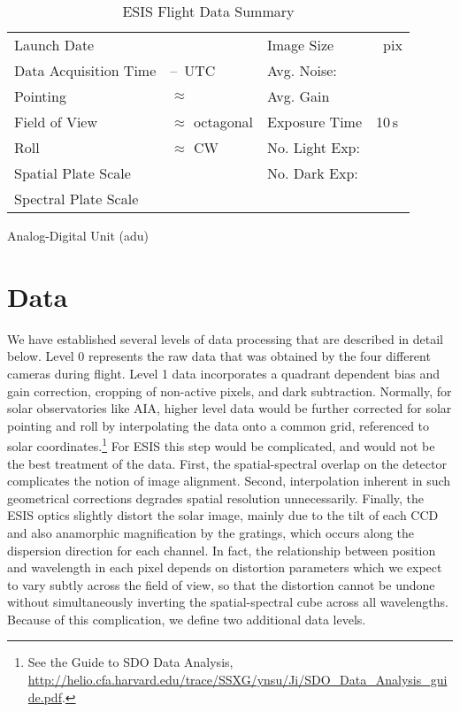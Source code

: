 		\begin{table}
		\begin{center}
			\caption{ESIS Flight Data Summary}
			\label{tab:data_info}
			\begin{tabular}{ll|ll}\hline
				Launch Date & \dateMission & Image Size  & \imageShape~pix\\
				Data Acquisition Time & \timeDataStart--\timeDataStop~UTC & Avg. Noise: & \readoutNoise\\ 
			    Pointing   &  $\approx$ \esispointing & Avg. Gain &   \gain \\
				Field of View  & $\approx$ \esisfov octagonal  & Exposure Time & 10\,s \\
				Roll & $\approx$ \esisroll CW & No. Light Exp: &\numDataFrames\\
			    Spatial  Plate Scale  &  \plateScale & No. Dark Exp: &\numDarkFrames \\
				Spectral  Plate Scale  &  \dispersion & \\
					\hline
			\end{tabular}
		Analog-Digital Unit (adu)
		\end{center}
		\end{table}
		
		



	
\section{Data} 

We have established several levels of data processing that are described in detail below.
Level 0 represents the raw data that was obtained by the four different cameras during flight.
Level 1 data incorporates %
a quadrant dependent bias and gain correction, cropping of non-active pixels, and dark subtraction.
Normally, for solar observatories like AIA, higher level data would be further corrected for solar pointing and roll by interpolating the data onto a common grid, referenced to solar coordinates.\footnote{See the Guide to SDO Data Analysis, \url{http://helio.cfa.harvard.edu/trace/SSXG/ynsu/Ji/SDO_Data_Analysis_guide.pdf}.}  For ESIS this step would be complicated, and would not be the best treatment of the data.  
First, the spatial-spectral overlap on the detector complicates the notion of image alignment. Second, interpolation inherent in such geometrical corrections degrades spatial resolution unnecessarily.  
Finally, the ESIS optics slightly distort the solar image, mainly due to the tilt of each CCD and also anamorphic magnification by the gratings, which occurs along the dispersion direction for each channel. 
In fact, the relationship between position and wavelength in each pixel depends on distortion parameters which we expect to vary subtly across the field of view, so that the distortion cannot be undone without simultaneously inverting the spatial-spectral cube across all wavelengths.
Because of this complication, we define two additional data levels.  

